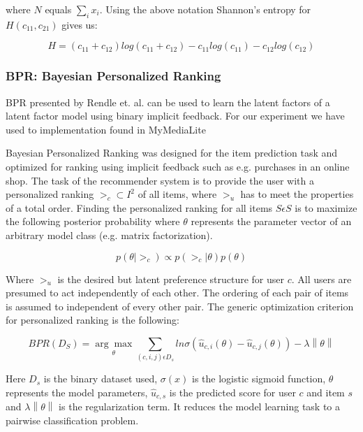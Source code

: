 where $N$ equals $\sum_i x_i$. Using the above notation Shannon's entropy for $H(c_{11}, c_{21})$ gives us:

\begin{equation}
H = (c_{11} + c_{12})log(c_{11} + c_{12})-c_{11} log(c_{11}) - c_{12} log(c_{12})
\end{equation}



\subsubsection{BPR: Bayesian Personalized Ranking}

BPR presented by Rendle et. al. \cite{Rendle2009} can be used to learn the latent factors of a
latent factor model using binary implicit feedback. For our experiment we have used to implementation
found in MyMediaLite \cite{Gantner2011MyMediaLite}

Bayesian Personalized Ranking was designed for the item prediction task and optimized for ranking using implicit
feedback such as e.g. purchases in an online shop. The task of the recommender system is to provide the
user with a personalized ranking $>_c \subset I^2$ of all items, where $>_u$ has to meet the properties of a total order.
Finding the personalized ranking for all items $S \epsilon S$ is to maximize the following posterior probability
where $\theta$ represents the parameter vector of an arbitrary model class (e.g. matrix factorization).

\begin{equation}
p(\theta | >_c) \propto p(>_c | \theta) p(\theta)
\end{equation}

Where $>_u$ is the desired but latent preference structure for user $c$. All users are presumed to act
independently of each other. The ordering of each pair of items is assumed to independent of every other pair.
The generic optimization criterion for personalized ranking is the following:

\begin{equation}
BPR(D_S) = \underset{\theta}{\arg\max} \sum_{(c,i,j)\epsilon D_s} ln \sigma(\hat{u}_{c,i}(\theta)-\hat{u}_{c,j}(\theta)) - \lambda \left\|\theta \right\|
\end{equation}

Here $D_s$ is the binary dataset used, $\sigma(x)$ is the logistic sigmoid function, $\theta$ represents
the model parameters, $\hat{u}_{c,s}$ is the predicted score for user $c$ and item $s$ and
$\lambda \left\|\theta \right\|$ is the regularization term. It reduces the model learning task to
a pairwise classification problem.\newline

